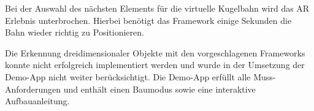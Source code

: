 Bei der Auswahl des nächsten Elements für die virtuelle Kugelbahn wird das AR Erlebnis unterbrochen. Hierbei benötigt das Framework einige Sekunden die Bahn wieder richtig zu Positionieren.

Die Erkennung dreidimensionaler Objekte mit den vorgeschlagenen Frameworks konnte nicht erfolgreich implementiert werden und wurde in der Umsetzung der Demo-App nicht weiter berücksichtigt. Die Demo-App erfüllt alle Muss-Anforderungen und enthält einen Baumodus sowie eine interaktive Aufbauanleitung.
